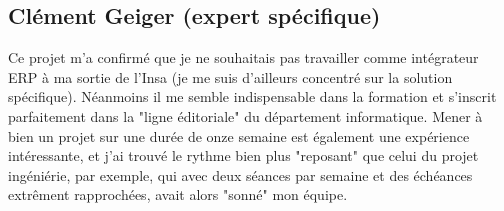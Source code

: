\subsection{Clément Geiger (expert spécifique)}

Ce projet m'a confirmé que je ne souhaitais pas travailler comme
intégrateur ERP à ma sortie de l'Insa (je me suis d'ailleurs concentré sur
la solution spécifique). Néanmoins il me semble indispensable dans la
formation et s'inscrit parfaitement dans la "ligne éditoriale" du
département informatique. Mener à bien un projet sur une durée de onze
semaine est également une expérience intéressante, et j'ai trouvé le rythme
bien plus "reposant" que celui du projet ingéniérie, par exemple, qui avec
deux séances par semaine et des échéances extrêment rapprochées, avait
alors "sonné" mon équipe. 

